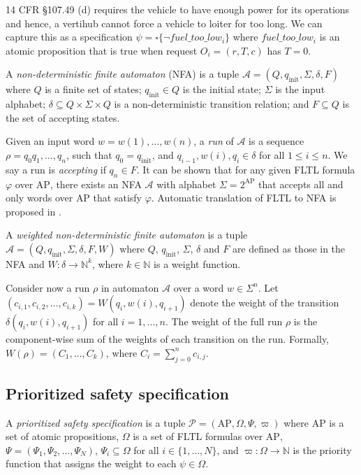 \begin{eg}
 14 CFR \S 107.49 (d) requires the vehicle to have enough power for its operations and hence, a vertihub cannot force a vehicle to loiter for too long. We can capture this as a specification $\psi = \square \{\lnot fuel\_too\_low_i\} $ where $fuel\_too\_low_i$ is an atomic proposition that is true when request $O_i = (r,T,c)$ has $T = 0$.
\end{eg}



A \emph{non-deterministic finite automaton} (NFA) is a  tuple $\mathcal A = (Q,q_{\text{init}},\Sigma,\delta,F)$ where $Q$ is a finite set of states; $q_{\text{init}} \in Q$ is the initial state; $\Sigma$ is the input alphabet; $\delta \subseteq Q \times \Sigma \times Q$ is a non-deterministic transition relation; and $F \subseteq Q$ is the set of accepting states. 

Given an input word $w = w(1),\dots,w(n)$, a \emph{run} of $\mathcal A$ is a sequence $\rho = q_0q_1,\dots,q_n$, such that $q_0 = q_{\text{init}}$, and $q_{i-1},w(i),q_i \in \delta$ for all $1 \leq i \leq n$. We say a run is \emph{accepting} if $q_n \in F$. It can be shown that for any given FLTL formula $\varphi$ over $\text{AP}$, there exists an NFA $\mathcal{A}$ with alphabet $\Sigma = 2^{\text{AP}}$ that accepts all and only words over $\text{AP}$ that satisfy $\varphi$. Automatic translation of FLTL to NFA is proposed in \cite{}.

A \emph{weighted non-deterministic finite automaton} is a tuple $\mathcal A = (Q,q_{\text{init}},\Sigma,\delta,F,W)$ where $Q$, $q_{\text{init}}$, $\Sigma$, $\delta$ and $F$ are defined as those in the NFA and $W : \delta \rightarrow \mathbb{N}^k$, where $k \in \mathbb{N}$ is a weight function.  

Consider now a run $\rho$ in automaton $\mathcal A$ over a word $w \in \Sigma^{n}$. Let $\left(c_{i,1},c_{i,2},\dots,c_{i,k}\right) = W(q_{i},w(i),q_{i+1})$ denote the weight of the transition $\delta(q_{i},w(i),q_{i+1})$ for all $i = 1,\dots,n$. The weight of the full run $\rho$ is the component-wise sum of the weights of each transition on the run. Formally, $W(\rho) = \left(C_1,\dots,C_k \right)$, where $C_i = \sum_{j=0}^n c_{i,j}$.




\subsection{Prioritized safety specification}
A \emph{prioritized safety specification} is a tuple
$\mathcal{P} = (\text{AP}, \Omega, \Psi, \varpi)$ where
$\text{AP}$ is a set of atomic propositions,
$\Omega$ is a set of FLTL formulas over $\text{AP}$,
$\Psi = (\Psi_1, \Psi_2, \ldots, \Psi_N)$,
$\Psi_i \subseteq \Omega$
for all $i \in \{1, \ldots, N\}$,
and
$\varpi : \Omega \to \mathbb{N}$
is the priority function that assigns the weight to each
$\psi \in \Omega$.

